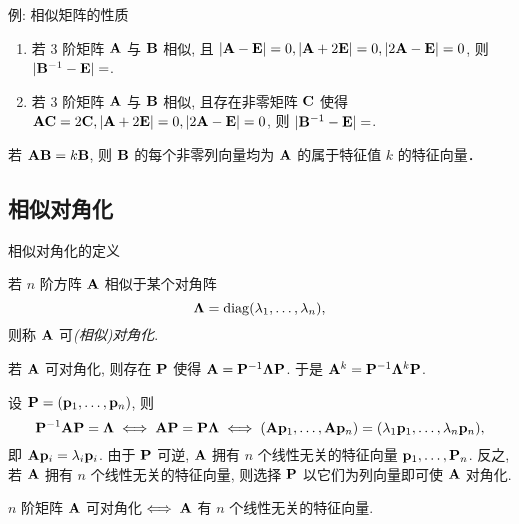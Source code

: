 \begin{frame}{例: 相似矩阵的性质}
	\onslide<+->
	\begin{exercise}
		\begin{enumerate}
			\item 若 $3$ 阶矩阵 ${\mathbf{A}}$ 与 ${\mathbf{B}}$ 相似, 且 $|{\mathbf{A}}-{\mathbf{E}}|=0, |{\mathbf{A}}+2{\mathbf{E}}|=0, |2{\mathbf{A}}-{\mathbf{E}}|=0$, 则 $|{\mathbf{B}}^{-1}-{\mathbf{E}}|=$.
			\item 若 $3$ 阶矩阵 ${\mathbf{A}}$ 与 ${\mathbf{B}}$ 相似, 且存在非零矩阵 ${\mathbf{C}}$ 使得 ${\mathbf{A}}{\mathbf{C}}=2{\mathbf{C}}, |{\mathbf{A}}+2{\mathbf{E}}|=0, |2{\mathbf{A}}-{\mathbf{E}}|=0$, 则 $|{\mathbf{B}}^{-1}-{\mathbf{E}}|=$.
		\end{enumerate}
	\end{exercise}
	\onslide<+->
	若 ${\mathbf{A}}{\mathbf{B}}=k{\mathbf{B}}$, 则 ${\mathbf{B}}$ 的每个非零列向量均为 ${\mathbf{A}}$ 的属于特征值 $k$ 的特征向量．
\end{frame}


\subsection{相似对角化}
\begin{frame}{相似对角化的定义}
	\onslide<+->
	\begin{definition}
		若 $n$ 阶方阵 ${\mathbf{A}}$ 相似于某个对角阵
		\[{\boldsymbol{\Lambda}}={\mathrm{diag}}(\lambda_1,\dots,\lambda_n),\]
		则称 ${\mathbf{A}}$ 可\emph{(相似)对角化}.
	\end{definition}
	\onslide<+->
	若 ${\mathbf{A}}$ 可对角化, 则存在 ${\mathbf{P}}$ 使得 ${\mathbf{A}}={\mathbf{P}}^{-1}{\boldsymbol{\Lambda}}{\mathbf{P}}$.
	\onslide<+->
	于是 ${\mathbf{A}}^k={\mathbf{P}}^{-1}{\boldsymbol{\Lambda}}^k{\mathbf{P}}$.
	
	\onslide<+->
	设 ${\mathbf{P}}=({\mathbf{p}}_1,\dots,{\mathbf{p}}_n)$, 则
	\[{\mathbf{P}}^{-1}{\mathbf{A}}{\mathbf{P}}={\boldsymbol{\Lambda}}\iff
	{\mathbf{A}}{\mathbf{P}}={\mathbf{P}}{\boldsymbol{\Lambda}}\iff
	({\mathbf{A}}{\mathbf{p}}_1,\dots,{\mathbf{A}}{\mathbf{p}}_n)
	=(\lambda_1{\mathbf{p}}_1,\dots,\lambda_n{\mathbf{p}}_n),\]
	\onslide<+->
	即 ${\mathbf{A}}{\mathbf{p}}_i=\lambda_i{\mathbf{p}}_i$.
	\onslide<+->
	由于 ${\mathbf{P}}$ 可逆, ${\mathbf{A}}$ 拥有 $n$ 个线性无关的特征向量 ${\mathbf{p}}_1,\dots,{\mathbf{P}}_n$.
	\onslide<+->
	反之, 若 ${\mathbf{A}}$ 拥有 $n$ 个线性无关的特征向量, 则选择 ${\mathbf{P}}$ 以它们为列向量即可使 ${\mathbf{A}}$ 对角化.
	\onslide<+->
	\begin{theorem}
		$n$ 阶矩阵 ${\mathbf{A}}$ 可对角化$\iff{\mathbf{A}}$ 有 $n$ 个线性无关的特征向量.
	\end{theorem}
\end{frame}


